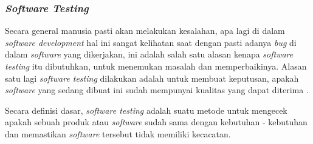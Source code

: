 \documentclass[a4paper]{article}
\newcommand{\subsubbab}[1]{%
    \subsubsection{#1}%
}
\begin{document}
\subsubbab{\textit{Software Testing}}

Secara general manusia pasti akan melakukan kesalahan, apa lagi di dalam \textit{software development} hal ini sangat kelihatan saat dengan pasti adanya \textit{bug} di dalam \textit{software} yang dikerjakan, ini adalah salah satu alasan kenapa \textit{software testing} itu dibutuhkan, untuk menemukan masalah dan memperbaikinya. Alasan satu lagi \textit{software testing} dilakukan adalah untuk membuat keputusan, apakah \textit{software} yang sedang dibuat ini sudah mempunyai kualitas yang dapat diterima \autocite{jorgensen2018software}.

Secara definisi dasar, \textit{software testing} adalah suatu metode untuk mengecek apakah sebuah produk atau \textit{software} sudah sama dengan kebutuhan - kebutuhan dan memastikan \textit{software} tersebut tidak memiliki kecacatan\autocite{guru99-software-testing}.
\end{document}
